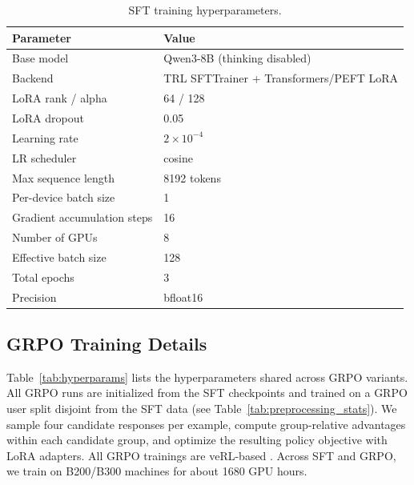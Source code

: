\documentclass{article} %
\begin{document}
\begin{table}[h]
\centering
\small
\begin{tabular}{ll}
\toprule
\textbf{Parameter} & \textbf{Value} \\
\midrule
Base model & Qwen3-8B (thinking disabled)\\
Backend & TRL SFTTrainer + Transformers/PEFT LoRA\\
LoRA rank / alpha & 64 / 128 \\
LoRA dropout & 0.05 \\
Learning rate & $2 \times 10^{-4}$ \\
LR scheduler & cosine \\
Max sequence length & 8192 tokens \\
Per-device batch size & 1 \\
Gradient accumulation steps & 16 \\
Number of GPUs & 8 \\
Effective batch size & 128 \\
Total epochs & 3 \\
Precision & bfloat16 \\
\bottomrule
\end{tabular}
\caption{SFT training hyperparameters.}
\label{tab:sft_hyperparams}
\end{table}

\subsection{GRPO Training Details}
\label{app:grpo_training_details}

Table~\ref{tab:hyperparams} lists the hyperparameters shared across GRPO variants. All GRPO runs are initialized from the SFT checkpoints and trained on a GRPO user split disjoint from the SFT data (see Table~\ref{tab:preprocessing_stats}). We sample four candidate responses per example, compute group-relative advantages within each candidate group, and optimize the resulting policy objective with LoRA adapters. All GRPO trainings are veRL-based \citep{verl}. Across SFT and GRPO, we train on B200/B300 machines for about 1680 GPU hours.
\end{document}
